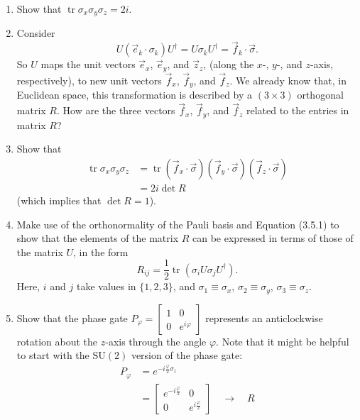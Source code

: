 \documentclass[fleqn]{article}
\providecommand{\tightlist}{%
  \setlength{\itemsep}{0pt}\setlength{\parskip}{0pt}}
\begin{document}
\begin{enumerate}
\def\labelenumi{\arabic{enumi}.}
\tightlist
\item
  Show that \(\operatorname{tr}\sigma_x\sigma_y\sigma_z = 2i\).
\item
  Consider
  \[
     U(\vec e_k\cdot\sigma_k)U^\dagger=U\sigma_kU^\dagger={\vec f_k}\cdot\vec\sigma.
   \]
  So \(U\) maps the unit vectors \(\vec e_x\), \(\vec e_y\), and \(\vec z_z\), (along the \(x\)-, \(y\)-, and \(z\)-axis, respectively), to new unit vectors \(\vec f_x\), \(\vec f_y\), and \(\vec f_z\).
  We already know that, in Euclidean space, this transformation is described by a \((3\times 3)\) orthogonal matrix \(R\).
  How are the three vectors \(\vec f_x\), \(\vec f_y\), and \(\vec f_z\) related to the entries in matrix \(R\)?
\item
  Show that
  \[
     \begin{aligned}
       \operatorname{tr}\sigma_x\sigma_y\sigma_z
       &= \operatorname{tr}({\vec f_x}\cdot\vec\sigma)( {\vec f_y}\cdot\vec\sigma)({\vec f_z}\cdot\vec\sigma)
     \\&= 2i\det R
     \end{aligned}
   \]
  (which implies that \(\det R=1\)).
\item
  Make use of the orthonormality of the Pauli basis and Equation (3.5.1) to show that the elements of the matrix \(R\) can be expressed in terms of those of the matrix \(U\), in the form
  \[
     R_{ij}=\frac12\operatorname{tr}\left(\sigma_i U\sigma_j U^\dagger\right).
   \]
  Here, \(i\) and \(j\) take values in \(\{1,2,3\}\), and \(\sigma_1\equiv\sigma_x\), \(\sigma_2\equiv\sigma_y\), \(\sigma_3\equiv\sigma_z\).
\item
  Show that the phase gate \(P_\varphi =\begin{bmatrix}1&0\\0&e^{i\varphi}\end{bmatrix}\) represents an anticlockwise rotation about the \(z\)-axis through the angle \(\varphi\).
  Note that it might be helpful to start with the \(\mathrm{SU}(2)\) version of the phase gate:
  \[
     \begin{aligned}
       P_\varphi
       &= e^{-i\frac{\varphi}{2}\sigma_z}
     \\&= \begin{bmatrix}
         e^{-i \frac{\varphi}{2}}& 0
       \\0 & e^{i \frac{\varphi}{2}}
       \end{bmatrix}
       \quad\longrightarrow\quad
       R

\end{aligned}\]
\end{enumerate}
\end{document}
